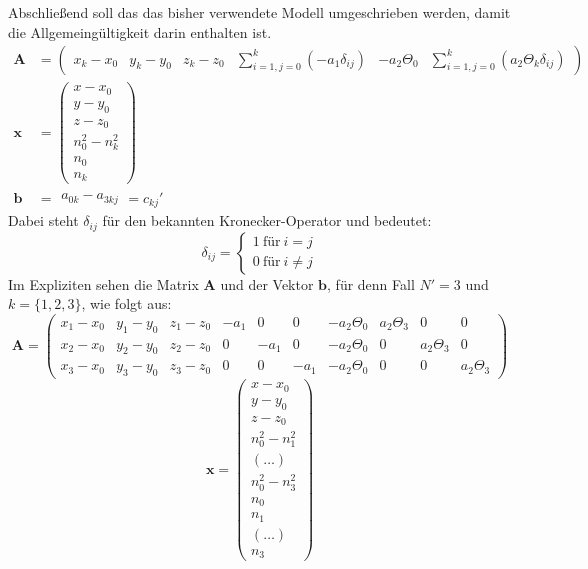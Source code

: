 {
Abschließend soll das das bisher verwendete Modell umgeschrieben werden, damit die Allgemeingültigkeit darin enthalten ist.
\begin{align}
%
%
\mathbf{A}&=
\left(
	\begin{array}{cccccc}
		x_k-x_0 & y_k-y_0 & z_k-z_0 & \sum_{i=1,j=0}^{k}(-a_1\delta_{ij}) &  -a_2\Theta_0 & \sum_{i=1,j=0}^{k}(a_2\Theta_k\delta_{ij})
	\end{array}
\right)\nonumber\\
%
\mathbf{x}&=
\left(
   \begin{array}{c}
	   x-x_0\\
	   y-y_0\\
	   z-z_0\\
	   n_0^2-n_k^2\\
	   n_0\\
	   n_k
   \end{array}
\right)\nonumber\\
%
\mathbf{b}&=
	\begin{array}{c}
		a_{0k}-a_{3kj} 
	\end{array}
	= c_{kj}'\nonumber
\end{align}
%
Dabei steht $\delta_{ij}$ für den bekannten Kronecker-Operator und bedeutet:
\begin{equation*}
\delta_{ij} = \begin{cases}1 ~\text{für}~ i=j\\ 0 ~\text{für}~ i\neq j\end{cases}
\end{equation*}
%
Im Expliziten sehen die Matrix $\mathbf{A}$ und der Vektor $\mathbf{b}$, für denn Fall $N'=3$ und $k=\{1,2,3\}$, wie folgt aus:
%
\begin{equation}
\mathbf{A}=
\left(
	\begin{array}{cccccccccc}
		x_1-x_0 & y_1-y_0 & z_1-z_0 & -a_1 & 0 & 0 & -a_2\Theta_0 & a_2\Theta_3 & 0 & 0 \\
		x_2-x_0 & y_2-y_0 & z_2-z_0 & 0 & -a_1 & 0 & -a_2\Theta_0& 0 & a_2\Theta_3 & 0 \\
		x_3-x_0 & y_3-y_0 & z_3-z_0 & 0 & 0 & -a_1 & -a_2\Theta_0& 0 & 0 & a_2\Theta_3
	\end{array}
\right) \nonumber
\end{equation}
%
\begin{equation}
\mathbf{x}=
\left(
	\begin{array}{c}
		x-x_0	\\
		y-y_0	\\
		z-z_0	\\
		n_0^2-n_1^2	\\
		(\dots)	\\
		n_0^2-n_3^2	\\
		n_0 \\
		n_1	\\
		(\dots)	\\
		n_3	
	\end{array}
\right)\nonumber
\end{equation}
%
}
